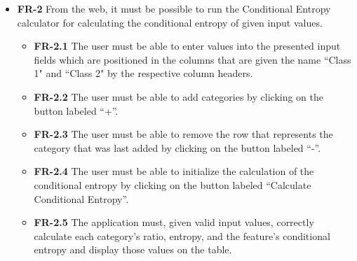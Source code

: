 \begin{itemize}
    \item \textbf{FR-2} From the web, it must be possible to run the Conditional Entropy calculator for calculating the conditional entropy of given input values.
    \begin{itemize}
        \item \textbf{FR-2.1} The user must be able to enter values into the presented input fields which are positioned in the columns that are given the name ``Class 1" and ``Class 2" by the respective column headers.
        \item \textbf{FR-2.2} The user must be able to add categories by clicking on the button labeled ``+''.
        \item \textbf{FR-2.3} The user must be able to remove the row that represents the category that was last added by clicking on the button labeled ``-''.
        \item \textbf{FR-2.4} The user must be able to initialize the calculation of the conditional entropy by clicking on the button labeled ``Calculate Conditional Entropy''.
        \item \textbf{FR-2.5} The application must, given valid input values, correctly calculate each category's ratio, entropy, and the feature's conditional entropy and display those values on the table.
    \end{itemize}
\end{itemize}

